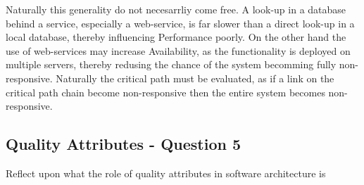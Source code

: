 Naturally this generality do not necesarrliy come free. A look-up in a database behind a service, especially a web-service, is far slower than a direct look-up in a local database, thereby influencing Performance poorly. On the other hand the use of web-services may increase Availability, as the functionality is deployed on multiple servers, thereby redusing the chance of the system becomming fully non-responsive. Naturally the critical path must be evaluated, as if a link on the critical path chain become non-responsive then the entire system becomes non-responsive.

\subsection{Quality Attributes - Question 5}

\begin{question}
Reflect upon what the role of quality attributes in software
architecture is
\end{question}


